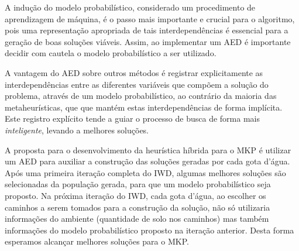 \documentclass[brazil]{article}
\begin{document}
A indução do modelo probabilístico, considerado um procedimento de aprendizagem de máquina,
é o passo mais importante e crucial para o algoritmo, pois uma representação
apropriada de tais interdependências é essencial para a ge\-ra\-ção de boas soluções viáveis.
Assim, ao implementar um AED é importante decidir com cautela o modelo probabilístico a ser utilizado.

A vantagem do AED sobre outros métodos é registrar explicitamente as interdependências
entre as diferentes variáveis que compõem a solução do problema, através de um modelo
probabilístico, ao contrário da maioria das metaheurísticas, que que mantém
estas interdependências de forma implícita.
Este registro explícito tende a guiar o processo de busca de forma mais
\textit{inteligente}, levando a melhores soluções.

A proposta para o desenvolvimento da heurística híbrida para o MKP
é utilizar um AED para auxiliar a construção das soluções geradas
por cada gota d'água.
Após uma primeira iteração completa do IWD,
algumas melhores soluções são selecionadas da população gerada,
para que um modelo probabilístico seja proposto.
Na próxima iteração do IWD, cada gota d'água, ao escolher os caminhos a serem tomados
para a construção da solução, não só utilizaria informações do ambiente
(quantidade de solo nos caminhos) mas também informações do modelo probabilístico
proposto na iteração anterior.
Desta forma esperamos alcançar melhores soluções para o MKP.


\end{document}
